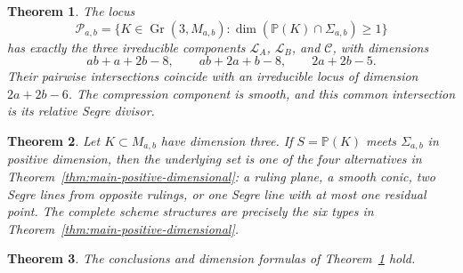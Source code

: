 \documentclass[10pt,a4paper]{amsart}
\newtheorem{theorem}{Theorem}
\newcommand{\Gr}{\operatorname{Gr}}
\newcommand{\chg}[1]{#1}
\begin{document}
\begin{theorem}\label{thm:components}
The locus
\[
\mathcal P_{a,b}=\{K\in\Gr(3,M_{a,b}):\dim(\mathbb P(K)\cap\Sigma_{a,b})\ge1\}
\]
has exactly the three irreducible components $\mathcal L_A$, $\mathcal L_B$, and $\mathcal C$, with dimensions
\[
ab+a+2b-8,\qquad ab+2a+b-8,\qquad 2a+2b-5.
\]
Their pairwise intersections coincide with an irreducible locus of dimension $2a+2b-6$. The compression component is smooth, and this common intersection is its relative Segre divisor.
\end{theorem}

\begin{theorem}\label{thm:positive-plane-sections}
Let $K\subset M_{a,b}$ have dimension three. If $S=\mathbb P(K)$ meets $\Sigma_{a,b}$ in positive dimension, then the underlying set is one of the four alternatives in Theorem~\ref{thm:main-positive-dimensional}: a ruling plane, a smooth conic, two \chg{Segre lines from opposite rulings}, or one Segre line with at most one residual point. The complete scheme structures are precisely the six types in Theorem~\ref{thm:main-positive-dimensional}.
\end{theorem}

\begin{theorem}\label{thm:global-components}
The conclusions and dimension formulas of Theorem~\ref{thm:components} hold.
\end{theorem}
\end{document}
